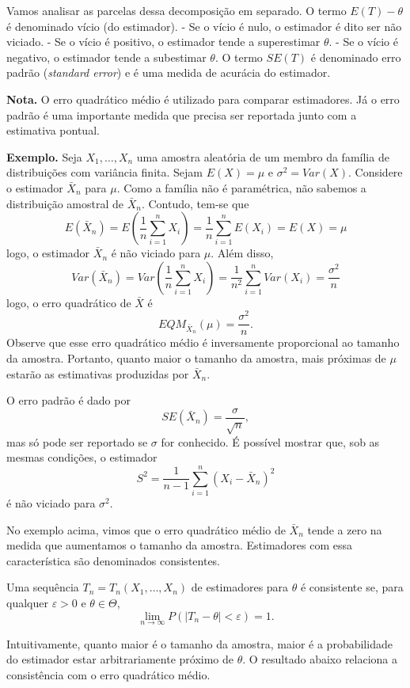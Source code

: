 \documentclass[
  letterpaper,
  DIV=11,
  numbers=noendperiod]{scrartcl}
\begin{document}
Vamos analisar as parcelas dessa decomposição em separado. O termo
\(E(T)-\theta\) é denominado vício (do estimador). - Se o vício é nulo,
o estimador é dito ser não viciado. - Se o vício é positivo, o estimador
tende a superestimar \(\theta\). - Se o vício é negativo, o estimador
tende a subestimar \(\theta\). O termo \(SE(T)\) é denominado erro
padrão (\emph{standard error}) e é uma medida de acurácia do estimador.

\textbf{Nota.} O erro quadrático médio é utilizado para comparar
estimadores. Já o erro padrão é uma importante medida que precisa ser
reportada junto com a estimativa pontual.

\textbf{Exemplo.} Seja \(X_1,\ldots,X_n\) uma amostra aleatória de um
membro da família de distribuições com variância finita. Sejam
\(E(X)=\mu\) e \(\sigma^2=Var(X)\). Considere o estimador \(\bar{X}_n\)
para \(\mu\). Como a família não é paramétrica, não sabemos a
distribuição amostral de \(\bar{X}_n\). Contudo, tem-se que
\[E(\bar{X}_n)=E\left(\frac{1}{n}\sum_{i=1}^n X_i\right)=\frac{1}{n}\sum_{i=1}^nE(X_i)=E(X)=\mu\]
logo, o estimador \(\bar{X}_n\) é não viciado para \(\mu\). Além disso,
\[Var(\bar{X}_n)=Var\left(\frac{1}{n}\sum_{i=1}^{n}X_i\right)=\frac{1}{n^2}\sum_{i=1}^n Var(X_i)=\frac{\sigma^2}{n}\]
logo, o erro quadrático de \(\bar{X}\) é
\[EQM_{\bar{X}_n}(\mu)=\frac{\sigma^2}{n}.\] Observe que esse erro
quadrático médio é inversamente proporcional ao tamanho da amostra.
Portanto, quanto maior o tamanho da amostra, mais próximas de \(\mu\)
estarão as estimativas produzidas por \(\bar{X}_n\).

O erro padrão é dado por \[SE(\bar{X}_n)=\frac{\sigma}{\sqrt{n}},\] mas
só pode ser reportado se \(\sigma\) for conhecido. É possível mostrar
que, sob as mesmas condições, o estimador
\[S^2=\frac{1}{n-1}\sum_{i=1}^n (X_i-\bar{X}_n)^2\] é não viciado para
\(\sigma^2\).

No exemplo acima, vimos que o erro quadrático médio de \(\bar{X}_n\)
tende a zero na medida que aumentamos o tamanho da amostra. Estimadores
com essa característica são denominados consistentes.

Uma sequência \(T_n=T_n(X_1,\ldots,X_n)\) de estimadores para \(\theta\)
é consistente se, para qualquer \(\varepsilon>0\) e \(\theta\in\Theta\),
\[\lim_{n\rightarrow\infty} P(|T_n-\theta|<\varepsilon)=1.\]

Intuitivamente, quanto maior é o tamanho da amostra, maior é a
probabilidade do estimador estar arbitrariamente próximo de \(\theta\).
O resultado abaixo relaciona a consistência com o erro quadrático médio.
\end{document}

